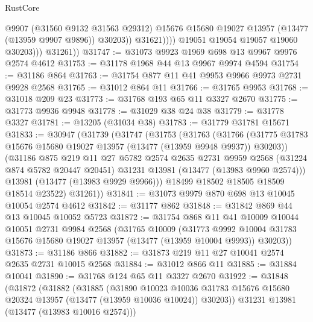 \begin{lexlean}{RustCore}
\begin{coremodule}
                          @9907
                          (@31560 @9132 @31563 @29312)
                          @15676
                          @15680
                          @19027
                          @13957
                          (@13477 (@13959 @9907 @9896))
                          @30203))
                      @31621))))
              @19051
              @19054
              @19057
              @19060
              @30203)))
        @31261))
@31747 := @31073 @9923 @1969 @698 @13 @9967 @9976 @2574 @4612
@31753 := @31178 @1968 @44 @13 @9967 @9974 @4594
@31754 := @31186 @864
@31763 := @31754 @877 @11 @41 @9953 @9966 @9973 @2731 @9928 @2568
@31765 := @31012 @864 @11
@31766 := @31765 @9953
@31768 := @31018 @209 @23
@31773 := @31768 @193 @65 @11 @3327 @2670
@31775 := @31773 @9936 @9948
@31778 := @31029 @38 @24 @38
@31779 := @31778 @3327
@31781 := @13205 (@31034 @38)
@31783 := @31779 @31781 @15671
@31833 := @30947
    (@31739
      (@31747
        (@31753
          (@31763
            (@31766
              (@31775 @31783 @15676 @15680 @19027 @13957 (@13477 (@13959 @9948 @9937)) @30203))
            (@31186
              @875
              @219
              @11
              @27
              @5782
              @2574
              @2635
              @2731
              @9959
              @2568
              (@31224 @874 @5782 @20447 @20451)
              @31231
              @13981
              (@13477 (@13983 @9960 @2574)))
            @13981
            (@13477 (@13983 @9929 @9966)))
          @18499
          @18502
          @18505
          @18509
          @18514
          @23522)
        @31261))
@31841 := @31073 @9979 @870 @698 @13 @10045 @10054 @2574 @4612
@31842 := @31177 @862
@31848 := @31842 @869 @44 @13 @10045 @10052 @5723
@31872 := @31754
    @868
    @11
    @41
    @10009
    @10044
    @10051
    @2731
    @9984
    @2568
    (@31765
      @10009
      (@31773
        @9992
        @10004
        @31783
        @15676
        @15680
        @19027
        @13957
        (@13477 (@13959 @10004 @9993))
        @30203))
@31873 := @31186 @866
@31882 := @31873 @219 @11 @27 @10041 @2574 @2635 @2731 @10015 @2568
@31884 := @31012 @866 @11
@31885 := @31884 @10041
@31890 := @31768 @124 @65 @11 @3327 @2670
@31922 := @31848
    (@31872
      (@31882
        (@31885
          (@31890
            @10023
            @10036
            @31783
            @15676
            @15680
            @20324
            @13957
            (@13477 (@13959 @10036 @10024))
            @30203))
        @31231
        @13981
        (@13477 (@13983 @10016 @2574)))

\end{coremodule}
\end{lexlean}
